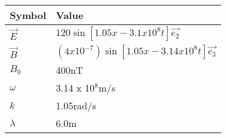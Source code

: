 \setlength{\arrayrulewidth}{0.3mm}
\setlength{\tabcolsep}{15pt}
\renewcommand{\arraystretch}{1.5}

\begin{center}
\begin{tabular}{ |p{0.6cm}|p{4.40cm}|  }


\hline
Symbol&Value\\
\hline
$\vec{E}$ & $120\sin[1.05x - 3.1 x 10^8t]\vec{e_2}$\\
\hline
$\vec{B}$ & $(4 x 10^{-7})\sin[1.05x - 3.14 x 10^8t]\vec{e_3}$\\
\hline
$B_0$  & 400nT\\
\hline
$\omega$ &  3.14 x 10$^8$m/s\\
\hline
$k$  & 1.05rad/s\\
\hline
$\lambda$ & 6.0m\\

\hline
\end{tabular}
\end{center}